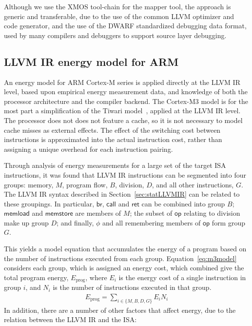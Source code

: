 \documentclass[9pt,preprint]{sigplanconf}
\newcommand{\mathspace}[1]{\ensuremath{#1}\xspace}
\newcommand{\instit}[1]{\mathspace{\mathsf{#1}}}
\newcommand{\op}{\instit{op}}
\newcommand{\memload}{\instit{memload}}
\newcommand{\memstore}{\instit{memstore}}
\newcommand{\call}{\instit{call}}
\newcommand{\ret}{\instit{ret}}
\newcommand{\br}{\instit{br}}
\newcommand{\secref}[1]{Section~\ref{sec:#1}}
\begin{document}
Although we use the XMOS tool-chain for the mapper tool, the approach is generic
and
transferable, due to the use of the common LLVM optimizer and code generator,
and the use of the DWARF standardized debugging data format, used by many
compilers and debuggers to support source layer debugging.

\subsection{LLVM IR energy model for ARM}
An energy model for ARM Cortex-M series is applied directly at the LLVM IR
level, based upon empirical energy measurement data, and knowledge of both the
processor architecture and the compiler backend. The Cortex-M3 model is for the
most part a simplification of the Tiwari model~\cite{Tiwari-embedded-1994},
applied at the LLVM IR level.  The processor does not does not feature a cache,
so it is not necessary to model cache misses as external effects. The effect of
the switching cost between instructions is approximated into the actual
instruction cost, rather than assigning a unique overhead for each instruction
pairing.

Through analysis of energy measurements for a large set of the target ISA
instructions, it was found that LLVM IR instructions can be segmented into four
groups: memory, $M$, program flow, $B$, division, $D$, and all other
instructions, $G$. The LLVM IR syntax described in \secref{statLLVMIR} can be
related to these groupings. In particular, $\br$, $\call$ and $\ret$ can be
combined into group $B$; $\memload$ and $\memstore$ are members of $M$; the
subset of $\op$ relating to division make up group $D$; and finally, $\phi$ and
all remembering members of $\op$ form group $G$.

This yields a model equation that accumulates the energy of a program based on
the number of instructions executed from each group. Equation~\ref{eq:m3model}
considers each group, which is assigned an energy cost, which combined give
the total program energy, $E_\text{prog}$, where $E_i$ is the energy cost of a
single instruction in group $i$, and $N_i$ is the number of instructions executed in
that group.
\begin{align}
E_{\text{prog}} =
    \sum_{i \in \{M,B,D,G\} }{
        E_i N_i
    }
\label{eq:m3model}
\end{align}
In addition, there are a number of other factors that affect energy, due to the
relation between the LLVM IR and the ISA:
\end{document}
